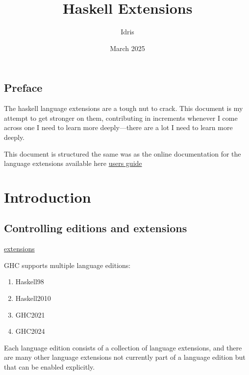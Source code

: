 \documentclass[openany, 12pt]{book}
\title{Haskell Extensions}
\author{Idris}
\date{March 2025}
\begin{document}
\tableofcontents

\frontmatter{}
\chapter{Preface}
The haskell language extensions are a tough nut to crack. This document is my
attempt to get stronger on them, contributing in increments whenever I come
across one I need to learn more deeply---there are a lot I need to learn more
deeply.

This document is structured the same was as the online documentation for the
language extensions available here
\href{https://ghc.gitlab.haskell.org/ghc/doc/users_guide/exts.html}{users guide}

\mainmatter{}
\part{Introduction}
\chapter{Controlling editions and extensions}
\href{https://ghc.gitlab.haskell.org/ghc/doc/users_guide/exts/control.html}{extensions}

GHC supports multiple language editions:

\begin{multicols}{4}
	\begin{enumerate}[label = {(\arabic*)}]
		\item Haskell98
		\item Haskell2010
		\item GHC2021
		\item GHC2024
	\end{enumerate}
\end{multicols}

Each language edition consists of a collection of language extensions, and there
are many other language extensions not currently part of a language edition but
that can be enabled explicitly.
\end{document}
